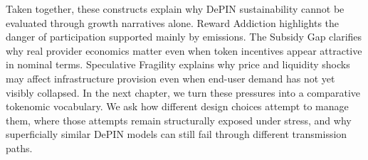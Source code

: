Taken together, these constructs explain why DePIN sustainability cannot be evaluated through growth narratives alone. Reward Addiction highlights the danger of participation supported mainly by emissions. The Subsidy Gap clarifies why real provider economics matter even when token incentives appear attractive in nominal terms. Speculative Fragility explains why price and liquidity shocks may affect infrastructure provision even when end-user demand has not yet visibly collapsed. In the next chapter, we turn these pressures into a comparative tokenomic vocabulary. We ask how different design choices attempt to manage them, where those attempts remain structurally exposed under stress, and why superficially similar DePIN models can still fail through different transmission paths.
